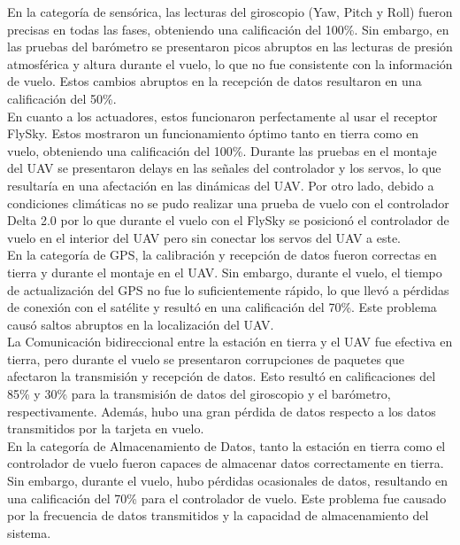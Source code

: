 En la categoría de sensórica, las lecturas del giroscopio (Yaw, Pitch y Roll) fueron precisas en todas las fases, obteniendo una calificación del 100\%. Sin embargo, en las pruebas del barómetro se presentaron picos abruptos en las lecturas de presión atmosférica y altura durante el vuelo, lo que no fue consistente con la información de vuelo. Estos cambios abruptos en la recepción de datos resultaron en una calificación del 50\%.\\

En cuanto a los actuadores, estos funcionaron perfectamente al usar el receptor FlySky. Estos mostraron un funcionamiento óptimo tanto en tierra como en vuelo, obteniendo una calificación del 100\%. Durante las pruebas en el montaje del UAV se presentaron delays en las señales del controlador y los servos, lo que resultaría en una afectación en las dinámicas del UAV. Por otro lado, debido a condiciones climáticas no se pudo realizar una prueba de vuelo con el controlador Delta 2.0 por lo que durante el vuelo con el FlySky se posicionó el controlador de vuelo en el interior del UAV pero sin conectar los servos del UAV a este.\\

En la categoría de GPS, la calibración y recepción de datos fueron correctas en tierra y durante el montaje en el UAV. Sin embargo, durante el vuelo, el tiempo de actualización del GPS no fue lo suficientemente rápido, lo que llevó a pérdidas de conexión con el satélite y resultó en una calificación del 70\%. Este problema causó saltos abruptos en la localización del UAV.\\

La Comunicación bidireccional entre la estación en tierra y el UAV fue efectiva en tierra, pero durante el vuelo se presentaron corrupciones de paquetes que afectaron la transmisión y recepción de datos. Esto resultó en calificaciones del 85\% y 30\% para la transmisión de datos del giroscopio y el barómetro, respectivamente. Además, hubo una gran pérdida de datos respecto a los datos transmitidos por la tarjeta en vuelo.\\

En la categoría de Almacenamiento de Datos, tanto la estación en tierra como el controlador de vuelo fueron capaces de almacenar datos correctamente en tierra. Sin embargo, durante el vuelo, hubo pérdidas ocasionales de datos, resultando en una calificación del 70\% para el controlador de vuelo. Este problema fue causado por la frecuencia de datos transmitidos y la capacidad de almacenamiento del sistema.\\

